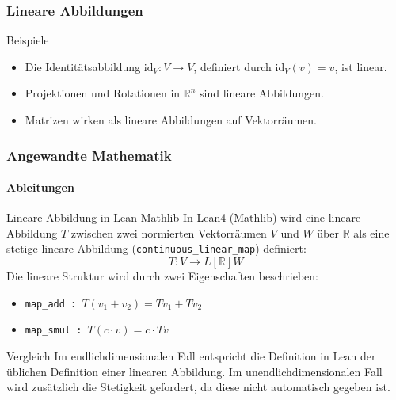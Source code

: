 \documentclass{beamer}
\begin{document}
    \begin{frame}
        \frametitle{Lineare Abbildungen}
    
    
        \begin{block}{Beispiele}
            \begin{itemize}
                \item Die Identitätsabbildung \( \text{id}_V: V \to V \), definiert durch \( \text{id}_V(v) = v \), ist linear.
                \item Projektionen und Rotationen in \( \mathbb{R}^n \) sind lineare Abbildungen.
                \item Matrizen wirken als lineare Abbildungen auf Vektorräumen.
            \end{itemize}
        \end{block}
        
    \end{frame}
    


    \begin{frame}
        \frametitle{Angewandte Mathematik}
        \framesubtitle{Ableitungen}
    
        \begin{block}{Lineare Abbildung in Lean \href{https://github.com/leanprover-community/mathlib4/blob/f4f0b47a2f859d27e965c812344deb1435fe8d48/Mathlib/Topology/Algebra/Module/Basic.lean\#L222-L225}{Mathlib}}
            In Lean4 (Mathlib) wird eine lineare Abbildung \( T \) zwischen zwei normierten Vektorräumen \( V \) und \( W \) über \( \mathbb{R} \) als eine stetige lineare Abbildung (\texttt{continuous\_linear\_map}) definiert:
            \[
            T : V \to L[\mathbb{R}] W
            \]
            Die lineare Struktur wird durch zwei Eigenschaften beschrieben:
            \begin{itemize}
                \item \texttt{map\_add : $T (v_1 + v_2) = T v_1 + T v_2$}
                \item \texttt{map\_smul : $T (c \cdot v) = c \cdot T v$}
            \end{itemize}
        \end{block}
    
        \begin{block}{Vergleich}
           Im endlichdimensionalen Fall entspricht die Definition in Lean der üblichen Definition einer linearen Abbildung. 
           Im unendlichdimensionalen Fall wird zusätzlich die Stetigkeit gefordert, da diese nicht automatisch gegeben ist.
        \end{block}
        
    \end{frame}
    
\end{document}
